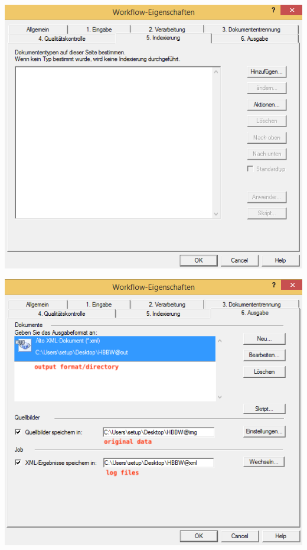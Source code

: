 \begin{minipage}{0.4\textwidth}
\begin{center}
\includegraphics[scale=0.42]{5_indexierung.png}
\end{center}
\end{minipage}
\begin{minipage}{0.4\textwidth}
\begin{center}
\includegraphics[scale=0.42]{6_ausgabe.png}
\end{center}
\end{minipage}


